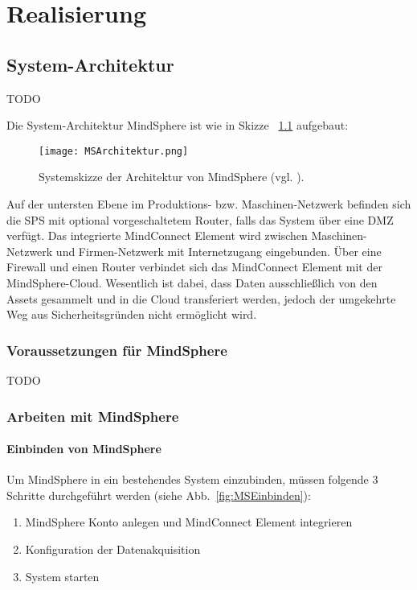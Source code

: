 \chapter{Realisierung}
\label{cha:realisierung}

\section{System-Architektur}
TODO

Die System-Architektur MindSphere ist wie in Skizze ~\ref{fig:MSSystemArchitektur} aufgebaut:

\begin{figure} [H]
\centering
\texttt{[image: MSArchitektur.png]} 
\caption{Systemskizze der Architektur von MindSphere (vgl. \cite{SiemensMSMCSecurity}).}
\label{fig:MSSystemArchitektur}
\end{figure}

Auf der untersten Ebene im Produktions- bzw. Maschinen-Netzwerk befinden sich die \ac{SPS} mit optional vorgeschaltetem Router, falls das System über eine \ac{DMZ} verfügt. Das integrierte MindConnect Element wird zwischen Maschinen-Netzwerk und Firmen-Netzwerk mit Internetzugang eingebunden. Über eine Firewall und einen Router verbindet sich das MindConnect Element mit der MindSphere-Cloud. Wesentlich ist dabei, dass Daten ausschließlich von den Assets gesammelt und in die Cloud transferiert werden, jedoch der umgekehrte Weg aus Sicherheitsgründen nicht ermöglicht wird.

\subsection{Voraussetzungen für MindSphere}
TODO

\subsection{Arbeiten mit MindSphere}

\subsubsection{Einbinden von MindSphere}
Um MindSphere in ein bestehendes System einzubinden, müssen folgende 3 Schritte durchgeführt werden (siehe Abb.~\ref{fig:MSEinbinden}):

\begin{enumerate}
\item MindSphere Konto anlegen und MindConnect Element integrieren
\item Konfiguration der Datenakquisition
\item System starten
\end{enumerate}


